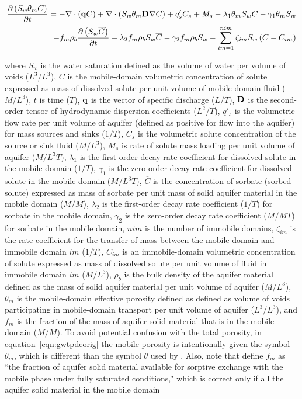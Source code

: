 \begin{equation}
\label{eqn:gwtpdeorig}
\begin{aligned}
\frac {\partial \left ( S_w \theta_m C \right )}{\partial t} = 
- \nabla \cdot \left ( \mathbf{q} C  \right ) 
+ \nabla \cdot \left ( S_w \theta_m \mathbf{D} \nabla C \right ) 
+ q'_s C_s + M_s  
- \lambda_1 \theta_m S_w C - \gamma_1 \theta_m S_w \\
- f_m \rho_b \frac {\partial \left ( S_w \overline{C} \right ) }{\partial t} 
- \lambda_2 f_m \rho_b S_w \overline{C} - \gamma_2 f_m \rho_b S_w 
- \sum \limits_{im=1}^{nim}  \zeta_{im} S_w \left ( C - C_{im} \right )
\end{aligned}
\end{equation}

\noindent where $S_w$ is the water saturation defined as the volume of water per volume of voids ($L^3/L^3$), $C$ is the mobile-domain volumetric concentration of solute expressed as mass of dissolved solute per unit volume of mobile-domain fluid ($M/L^3$), $t$ is time ($T$), $\mathbf{q}$ is the vector of specific discharge ($L/T$), $\mathbf{D}$ is the second-order tensor of hydrodynamic dispersion coefficients ($L^2/T$), $q'_s$ is the volumetric flow rate per unit volume of aquifer (defined as positive for flow into the aquifer) for mass sources and sinks ($1/T$), $C_s$ is the volumetric solute concentration of the source or sink fluid ($M/L^3$), $M_s$ is rate of solute mass loading per unit volume of aquifer ($M/L^3T$), $\lambda_1$ is the first-order decay rate coefficient for dissolved solute in the mobile domain ($1/T$), $\gamma_1$ is the zero-order decay rate coefficient for dissolved solute in the mobile domain ($M/L^3T$), $\overline{C}$ is the concentration of sorbate (sorbed solute) expressed as mass of sorbate per unit mass of solid aquifer material in the mobile domain ($M/M$), $\lambda_2$ is the first-order decay rate coefficient ($1/T$) for sorbate in the mobile domain, $\gamma_2$ is the zero-order decay rate coefficient ($M/MT$) for sorbate in the mobile domain, $nim$ is the number of immobile domains, $\zeta_{im}$ is the rate coefficient for the transfer of mass between the mobile domain and immobile domain $im$ ($1/T$), $C_{im}$ is an immobile-domain volumetric concentration of solute expressed as mass of dissolved solute per unit volume of fluid in immobile domain $im$ ($M/L^3$), $\rho_{b}$ is the bulk density of the aquifer material defined as the mass of solid aquifer material per unit volume of aquifer ($M/L^3$), $\theta_m$ is the mobile-domain effective porosity defined as defined as volume of voids participating in mobile-domain transport per unit volume of aquifer ($L^3/L^3$), and $f_m$ is the fraction of the mass of aquifer solid material that is in the mobile domain ($M/M$). To avoid potential confusion with the total porosity, in equation~\ref{eqn:gwtpdeorig} the mobile porosity is intentionally given the symbol $\theta_m$, which is different than the symbol $\theta$ used by \cite{modflow6gwt}. Also, note that \cite{modflow6gwt} define $f_m$ as ``the fraction of aquifer solid material available for sorptive exchange with the mobile phase under fully saturated conditions," which is correct only if all the aquifer solid material in the mobile domain 